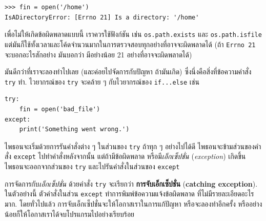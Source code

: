 \begin{verbatim}
>>> fin = open('/home')
IsADirectoryError: [Errno 21] Is a directory: '/home'
\end{verbatim}
%
%
เพื่อไม่ให้เกิดข้อผิดพลาดแบบนี้ 
เราควรใช้ฟังก์ชัน เช่น \texttt{os.path.exists}
และ \texttt{os.path.isfile}
แต่มันก็ใช้ทั้งเวลาและโค้ดจำนวนมากในการตรวจสอบทุกอย่างที่อาจจะผิดพลาดได้ 
(ถ้า \texttt{Errno 21} จะบอกอะไรสักอย่าง
มันบอกว่า มีอย่างน้อย 21 อย่างที่อาจจะผิดพลาดได้)

%
มันดีกว่าที่เราจะลองทำไปเลย (และค่อยไปจัดการกับปัญหา ถ้ามันเกิด)
ซึ่งนึ่งคือสิ่งที่ข้อความคำสั่ง \texttt{try} ทำ.
ไวยากรณ์ของ \texttt{try} จะคล้าย ๆ กับไวยากรณ์ของ \texttt{if...else} เช่น

\begin{verbatim}
try:    
    fin = open('bad_file')
except:
    print('Something went wrong.')
\end{verbatim}
%
%
ไพธอนจะเริ่มด้วยการรันคำสั่งต่าง ๆ ในส่วนของ \texttt{try}
ถ้าทุก ๆ อย่างไปได้ดี ไพธอนจะข้ามส่วนของคำสั่ง \texttt{except}
ไปทำคำสั่งหลังจากนั้น
แต่ถ้ามีข้อผิดพลาด หรือมี\textit{เอ็กเซ็ปชั่น} (\textit{exception}) เกิดขึ้น
ไพธอนจะออกจากส่วนของ \texttt{try}
และไปรันคำสั่งในส่วนของ \texttt{except}

%
การจัดการกับ\textit{เอ็กเซ็ปชั่น} ด้วยคำสั่ง \texttt{try}
จะเรียกว่า \textbf{การจับเอ็กเซ็ปชั่น} (\textbf{catching exception}).
ในตัวอย่างนี้
ตัวคำสั่งในส่วน \texttt{except} ทำการพิมพ์ข้อความแจ้งข้อผิดพลาด 
ที่ไม่มีรายละเอียดอะไรมาก.
โดยทั่วไปแล้ว การจับเอ็กเซ็ปชั่นจะให้โอกาสเราในการแก้ปัญหา หรือจะลองทำอีกครั้ง
หรืออย่างน้อยก็ให้โอกาสเราได้จบโปรแกรมไปอย่างเรียบร้อย


